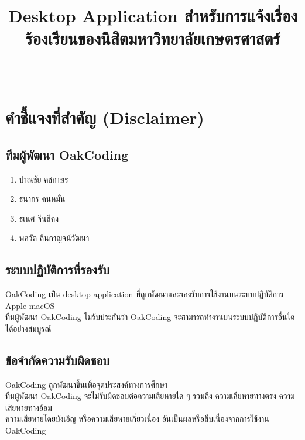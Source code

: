 \documentclass{article}
\title{\Huge\flushleft \textbf{\thetitle}\\
\vspace{1ex}
\LARGE\ourTeam\\
\vspace{5ex}
\large Desktop Application สำหรับการแจ้งเรื่องร้องเรียนของนิสิตมหาวิทยาลัยเกษตรศาสตร์}
\author{}
\date{}
\begin{document}
\begin{titlepage}
\maketitle
\thispagestyle{empty}
\vspace{5ex}

\noindent\rule{\textwidth + 1in}{0.6pt}

\section*{คำชี้แจงที่สำคัญ (Disclaimer)}

\subsection*{ทีมผู้พัฒนา OakCoding}

\begin{enumerate}
    \setlength{\itemsep}{0.7pt}
    \item ปาณชัย คชกาษร
    \item ธนากร คนหมั่น
    \item ธเนศ จีนสีคง
    \item พศวัต ถิ่นกาญจน์วัฒนา
\end{enumerate}

\subsection*{ระบบปฏิบัติการที่รองรับ}
OakCoding เป็น desktop application ที่ถูกพัฒนาและรองรับการใช้งานบนระบบปฏิบัติการ Apple macOS\\
ทีมผู้พัฒนา OakCoding ไม่รับประกันว่า OakCoding จะสามารถทำงานบนระบบปฏิบัติการอื่นใดได้อย่างสมบูรณ์

\subsection*{ข้อจำกัดความรับผิดชอบ}
OakCoding ถูกพัฒนาขึ้นเพื่อจุดประสงค์ทางการศึกษา\\
ทีมผู้พัฒนา OakCoding จะไม่รับผิดชอบต่อความเสียหายใด ๆ รวมถึง ความเสียหายทางตรง ความเสียหายทางอ้อม\\
ความเสียหายโดยบังเอิญ หรือความเสียหายเกี่ยวเนื่อง อันเป็นผลหรือสืบเนื่องจากการใช้งาน OakCoding
\end{titlepage}

\newpage

\tableofcontents

\newpage










\end{document}
